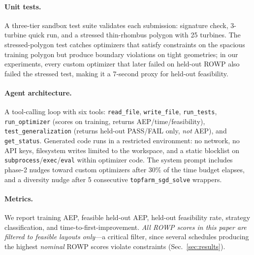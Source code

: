 \paragraph{Unit tests.}
A three-tier sandbox test suite validates each submission:
signature check, 3-turbine quick run, and a stressed thin-rhombus
polygon with 25 turbines. The stressed-polygon test catches
optimizers that satisfy constraints on the spacious training
polygon but produce boundary violations on tight geometries; in
our experiments, every custom optimizer that later failed on
held-out ROWP also failed the stressed test, making it a 7-second
proxy for held-out feasibility.

\paragraph{Agent architecture.}
A tool-calling loop with six tools: \texttt{read\_file},
\texttt{write\_file}, \texttt{run\_tests}, \texttt{run\_optimizer}
(scores on training, returns AEP/time/feasibility),
\texttt{test\_generalization} (returns held-out PASS/FAIL only,
\emph{not} AEP), and \texttt{get\_status}. Generated code runs in a
restricted environment: no network, no API keys, filesystem writes
limited to the workspace, and a static blocklist on
\texttt{subprocess}/\texttt{exec}/\texttt{eval} within optimizer
code. The system prompt includes phase-2 nudges toward custom
optimizers after 30\% of the time budget elapses, and a diversity
nudge after 5 consecutive \texttt{topfarm\_sgd\_solve} wrappers.

\paragraph{Metrics.}
We report training AEP, feasible held-out AEP, held-out feasibility
rate, strategy classification, and time-to-first-improvement.
\emph{All ROWP scores in this paper are filtered to feasible
layouts only}---a critical filter, since several schedules
producing the highest \emph{nominal} ROWP scores violate
constraints (Sec.~\ref{sec:results}).
